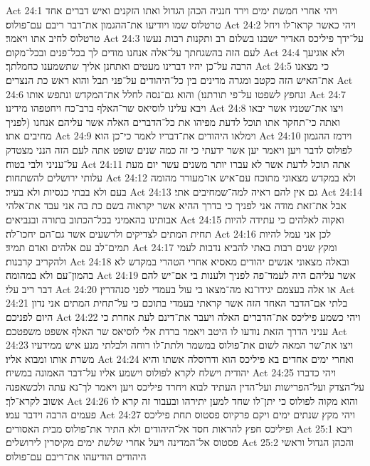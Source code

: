 Act 24:1  ויהי אחרי חמשת ימים וירד חנניה הכהן הגדול ואתו הזקנים ואיש דברים אחד טרטלוס שמו ויודיעו את־ההגמון את־דבר ריבם עם־פולוס׃
Act 24:2  ויהי כאשר קראו־לו ויחל טרטלוס לחיב אתו ויאמר׃
Act 24:3  על־ידך פיליכס האדיר ישבנו בשלום רב ותקנות רבות נעשו לעם הזה בהשגחתך על־אלה אנחנו מודים לך בכל־פנים ובכל־מקום׃
Act 24:4  ולא אוגיעך הרבה על־כן יהיו דברינו מעטים ואתחנן אליך שתשמענו כחמלתך׃
Act 24:5  כי מצאנו את־האיש הזה כקטב ומגרה מדינים בין כל־היהודים על־פני תבל והוא ראש כת הנצרים׃
Act 24:6  והוא גם־נסה לחלל את־המקדש ונתפש אותו (ונחפץ לשפטו על־פי תורתנו׃
Act 24:7  ויבא עלינו לוסיאס שר־האלף ברב־כח ויחטפהו מידינו׃
Act 24:8  ויצו את־שטניו אשר יבאו לפניך) ואתה כי־תחקר אתו תוכל לדעת מפיהו את כל־הדברים האלה אשר עליהם אנחנו מחיבים אתו׃
Act 24:9  וימלאו היהודים את־דבריו לאמר כי־כן הוא׃
Act 24:10  וירמז ההגמון לפולוס לדבר ויען ויאמר יען אשר ידעתי כי זה כמה שנים שופט אתה לעם הזה הנני מצטדק על־עניני ולבי בטוח׃
Act 24:11  אתה תוכל לדעת אשר לא עברו יותר משנים עשר יום מעת עלותי ירושלים להשתחות׃
Act 24:12  ולא במקדש מצאוני מתוכח עם־איש או־מעורר מהומה בעם ולא בבתי כנסיות ולא בעיר׃
Act 24:13  גם אין להם ראיה למה־שמחיבים אתי׃
Act 24:14  אבל את־זאת מודה אני לפניך כי בדרך ההיא אשר יקראוה בשם כת בה אני עבד את־אלהי אבותינו בהאמיני בכל־הכתוב בתורה ובנביאים׃
Act 24:15  ואקוה לאלהים כי עתידה להיות תחית המתים לצדיקים ולרשעים אשר גם־הם יחכו־לה׃
Act 24:16  לכן אני עמל להיות תמים־לב עם אלהים ואדם תמיד׃
Act 24:17  ומקץ שנים רבות באתי להביא נדבות לעמי ולהקריב קרבנות׃
Act 24:18  ובאלה מצאוני אנשים יהודים מאסיא אחרי הטהרי במקדש לא בהמון־עם ולא במהומה׃
Act 24:19  אשר עליהם היה לעמד־פה לפניך ולענות בי אם־יש להם דבר ריב עלי׃
Act 24:20  או אלה בעצמם יגידו־נא מה־מצאו בי עול בעמדי לפני סנהדרין׃
Act 24:21  בלתי אם־הדבר האחד הזה אשר קראתי בעמדי בתוכם כי על־תחית המתים אני נדון היום לפניכם׃
Act 24:22  ויהי כשמע פיליכס את־הדברים האלה ויעבר את־דינם לעת אחרת כי עניני הדרך הזאת נודעו לו היטב ויאמר ברדת אלי לוסיאס שר האלף אשפט משפטכם׃
Act 24:23  ויצו את־שר המאה לשום את־פולוס במשמר ולתת־לו רוחה ולבלתי מנע איש ממידעיו משרת אותו ומבוא אליו׃
Act 24:24  ואחרי ימים אחדים בא פיליכס הוא ודרוסלה אשתו והיא יהודית וישלח לקרא לפולוס וישמע אליו על־דבר האמונה במשיח׃
Act 24:25  ויהי כדברו על־הצדק ועל־הפרישות ועל־הדין העתיד לבוא ויחרד פיליכס ויען ויאמר לך־נא עתה ולכשאפנה אשוב לקרא־לך׃
Act 24:26  והוא מקוה לפולוס כי יתן־לו שחד למען יתירהו ובעבור זה קרא לו פעמים הרבה וידבר עמו׃
Act 24:27  ויהי מקץ שנתים ימים ויקם פרקיוס פסטוס תחת פיליכס ופיליכס חפץ להראות חסד אל־היהודים ולא התיר את־פולוס מבית האסורים׃
Act 25:1  ויבא פסטוס אל־המדינה ויעל אחרי שלשת ימים מקיסרין לירושלים׃
Act 25:2  והכהן הגדול וראשי היהודים הודיעהו את־ריבם עם־פולוס׃
